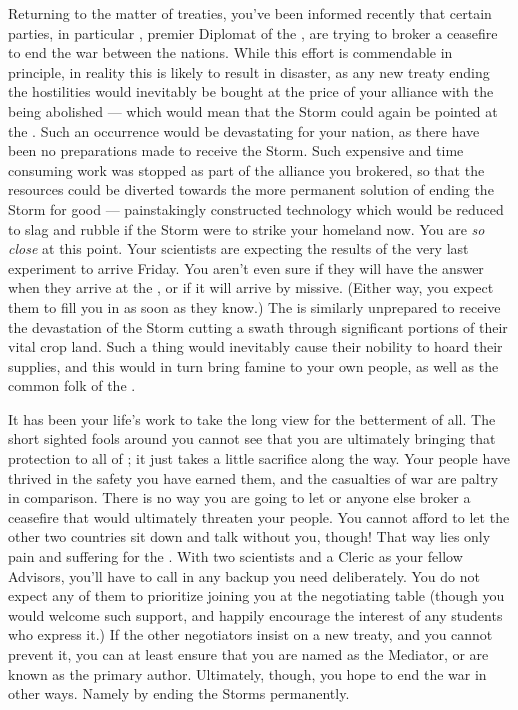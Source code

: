 \documentclass[char]{GL2020}
\begin{document}
Returning to the matter of treaties, you've been informed recently that certain parties, in particular \cHeadDiplomat{\intro}, premier Diplomat of the \pShip{}, are trying to broker a ceasefire to end the war between the nations. While this effort is commendable in principle, in reality this is likely to result in disaster, as any new treaty ending the hostilities would inevitably be bought at the price of your alliance with the \pFarm{} being abolished — which would mean that the Storm could again be pointed at the \pTech{}. Such an occurrence would be devastating for your nation, as there have been no preparations made to receive the Storm. Such expensive and time consuming work was stopped as part of the alliance you brokered, so that the resources could be diverted towards the more permanent solution of ending the Storm for good — painstakingly constructed technology which would be reduced to slag and rubble if the Storm were to strike your homeland now. You are \emph{so close} at this point. Your scientists are expecting the results of the very last experiment to arrive Friday. You aren’t even sure if they will have the answer when they arrive at the \pSchool{}, or if it will arrive by missive. (Either way, you expect them to fill you in as soon as they know.) The \pFarm{} is similarly unprepared to receive the devastation of the Storm cutting a swath through significant portions of their vital crop land. Such a thing would inevitably cause their nobility to hoard their supplies, and this would in turn bring famine to your own people, as well as the common folk of the \pFarm{}. 

It has been your life's work to take the long view for the betterment of all. The short sighted fools around you cannot see that you are ultimately bringing that protection to all of \pEarth{}; it just takes a little sacrifice along the way. Your people have thrived in the safety you have earned them, and the casualties of war are paltry in comparison. There is no way you are going to let \cHeadDiplomat{} or anyone else broker a ceasefire that would ultimately threaten your people. You cannot afford to let the other two countries sit down and talk without you, though! That way lies only pain and suffering for the \pTech{}. With two scientists and a Cleric as your fellow Advisors, you’ll have to call in any backup you need deliberately. You do not expect any of them to prioritize joining you at the negotiating table (though you would welcome such support, and happily encourage the interest of any \pTech{} students who express it.) If the other negotiators insist on a new treaty, and you cannot prevent it, you can at least ensure that you are named as the Mediator, or are known as the primary author. Ultimately, though, you hope to end the war in other ways. Namely by ending the Storms permanently.
\end{document}
